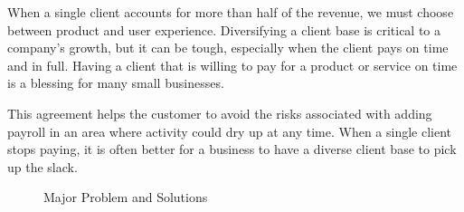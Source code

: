 \documentclass[12pt]{extarticle}
\numberwithin{figure}{section}
\begin{document}
When a single client accounts for more than half of the revenue, we must choose between product and user experience. Diversifying a client base is critical to a company's growth, but it can be tough, especially when the client pays on time and in full. Having a client that is willing to pay for a product or service on time is a blessing for many small businesses.

This agreement helps the customer to avoid the risks associated with adding payroll in an area where activity could dry up at any time. When a single client stops paying, it is often better for a business to have a diverse client base to pick up the slack.
\begin{figure}[ht]
    \centering  %
    \caption{Major Problem and Solutions}
\end{figure}
\end{document}
